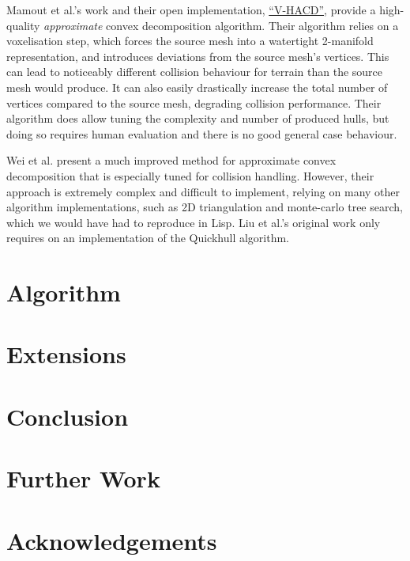 \documentclass[format=sigconf]{acmart}
\begin{document}
Mamout et al.\cite{mamou2016volumetric}'s work and their open implementation, \href{https://github.com/kmammou/v-hacd}{``V-HACD''}, provide a high-quality \textit{approximate} convex decomposition algorithm. Their algorithm relies on a voxelisation step, which forces the source mesh into a watertight 2-manifold representation, and introduces deviations from the source mesh's vertices. This can lead to noticeably different collision behaviour for terrain than the source mesh would produce. It can also easily drastically increase the total number of vertices compared to the source mesh, degrading collision performance. Their algorithm does allow tuning the complexity and number of produced hulls, but doing so requires human evaluation and there is no good general case behaviour.

Wei et al.\cite{wei2022coacd} present a much improved method for approximate convex decomposition that is especially tuned for collision handling. However, their approach is extremely complex and difficult to implement, relying on many other algorithm implementations, such as 2D triangulation and monte-carlo tree search, which we would have had to reproduce in Lisp. Liu et al.'s original work only requires on an implementation of the Quickhull\cite{barber1996quickhull} algorithm.

\section{Algorithm}\label{algorithm}

\section{Extensions}\label{extensions}

\section{Conclusion}\label{conclusion}

\section{Further Work}\label{further-work}

\section{Acknowledgements}\label{acknowledgements}


\end{document}
